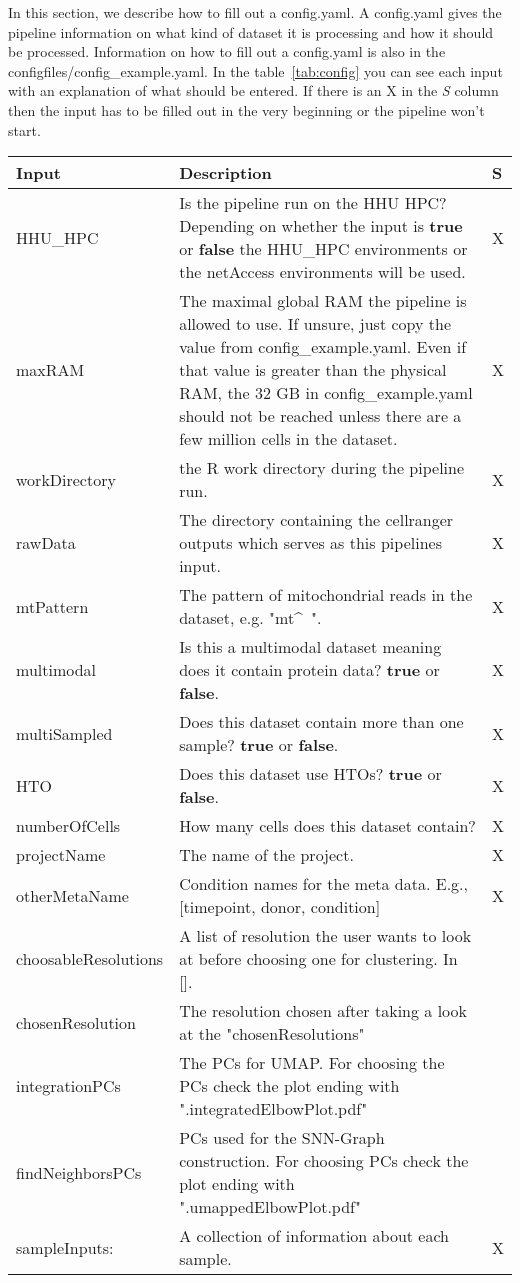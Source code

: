 In this section, we describe how to fill out a config.yaml. A config.yaml gives the pipeline information on what kind of dataset it is processing and how it should be processed. Information on how to fill out a config.yaml is also in the configfiles/config\_example.yaml. In the table~\ref{tab:config} you can see each input with an explanation of what should be entered. If there is an X in the \textit{S} column then the input has to be filled out in the very beginning or the pipeline won't start.

\begin{tabular}{p{3.5cm} | p{9.5cm} | p{0.1cm}}
	\label{tab:config}
	Input & Description & S\\
	\hline
	HHU\_HPC & Is the pipeline run on the HHU HPC? Depending on whether the input is \textbf{true} or \textbf{false} the HHU\_HPC environments or the netAccess environments will be used. & X\\
	maxRAM & The maximal global RAM the pipeline is allowed to use. If unsure, just copy the value from config\_example.yaml. Even if that value is greater than the physical RAM, the 32 GB in config\_example.yaml should not be reached unless there are a few million cells in the dataset. & X\\
	workDirectory & the R work directory during the pipeline run. & X\\
	rawData & The directory containing the cellranger outputs which serves as this pipelines input. & X\\
	mtPattern & The pattern of mitochondrial reads in the dataset, e.g. "mt\^~". & X\\
	multimodal & Is this a multimodal dataset meaning does it contain protein data? \textbf{true} or \textbf{false}. & X\\
	multiSampled & Does this dataset contain more than one sample? \textbf{true} or \textbf{false}. & X\\
	HTO & Does this dataset use HTOs? \textbf{true} or \textbf{false}. & X\\
	numberOfCells & How many cells does this dataset contain? & X\\
	projectName & The name of the project. & X\\
	otherMetaName & Condition names for the meta data. E.g., [timepoint, donor, condition] & X\\
	choosableResolutions & A list of resolution the user wants to look at before choosing one for clustering. In []. &  \\
	chosenResolution & The resolution chosen after taking a look at the "chosenResolutions" & \\
	integrationPCs & The PCs for UMAP. For choosing the PCs check the plot ending with ".integratedElbowPlot.pdf" & \\
	findNeighborsPCs & PCs used for the SNN-Graph construction. For choosing PCs check the plot ending with ".umappedElbowPlot.pdf" & \\
	sampleInputs: & A collection of information about each sample. & X\\
\end{tabular}

